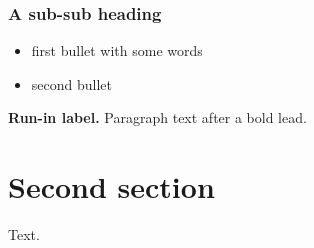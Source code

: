 \documentclass[
  10pt,
  table]{article}
\providecommand{\tightlist}{%
  \setlength{\itemsep}{0pt}\setlength{\parskip}{0pt}}
\renewcommand{\tightlist}{\setlength{\itemsep}{1.5pt}\setlength{\parskip}{0pt}}
\begin{document}
\subsubsection{A sub-sub heading}\label{a-sub-sub-heading}

\begin{itemize}
\tightlist
\item
  first bullet with some words
\item
  second bullet
\end{itemize}

\textbf{Run-in label.} Paragraph text after a bold lead.

\section{Second section}\label{second-section}

Text.
\end{document}

